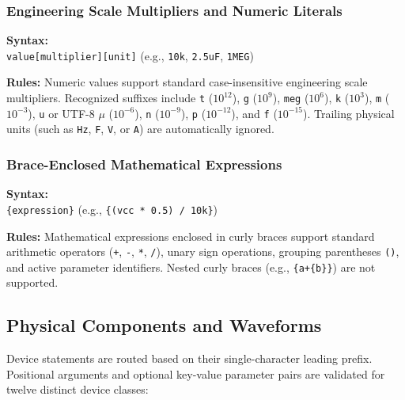 \subsubsection{Engineering Scale Multipliers and Numeric Literals}
\begin{compactitem}
    \item \textbf{Syntax:} \\
    \texttt{value[multiplier][unit]} (e.g., \texttt{10k}, \texttt{2.5uF}, \texttt{1MEG})
    \item \textbf{Rules:} Numeric values support standard case-insensitive engineering scale multipliers. Recognized suffixes include \texttt{t} ($10^{12}$), \texttt{g} ($10^9$), \texttt{meg} ($10^6$), \texttt{k} ($10^3$), \texttt{m} ($10^{-3}$), \texttt{u} or UTF-8 \(\mu\) ($10^{-6}$), \texttt{n} ($10^{-9}$), \texttt{p} ($10^{-12}$), and \texttt{f} ($10^{-15}$). Trailing physical units (such as \texttt{Hz}, \texttt{F}, \texttt{V}, or \texttt{A}) are automatically ignored.
\end{compactitem}

\subsubsection{Brace-Enclosed Mathematical Expressions}
\begin{compactitem}
    \item \textbf{Syntax:} \\
    \texttt{\{expression\}} (e.g., \texttt{\{(vcc * 0.5) / 10k\}})
    \item \textbf{Rules:} Mathematical expressions enclosed in curly braces support standard arithmetic operators (\texttt{+}, \texttt{-}, \texttt{*}, \texttt{/}), unary sign operations, grouping parentheses \texttt{()}, and active parameter identifiers. Nested curly braces (e.g., \texttt{\{a+\{b\}\}}) are not supported.
\end{compactitem}

\subsection{Physical Components and Waveforms}

Device statements are routed based on their single-character leading prefix. Positional arguments and optional key-value parameter pairs are validated for twelve distinct device classes:

